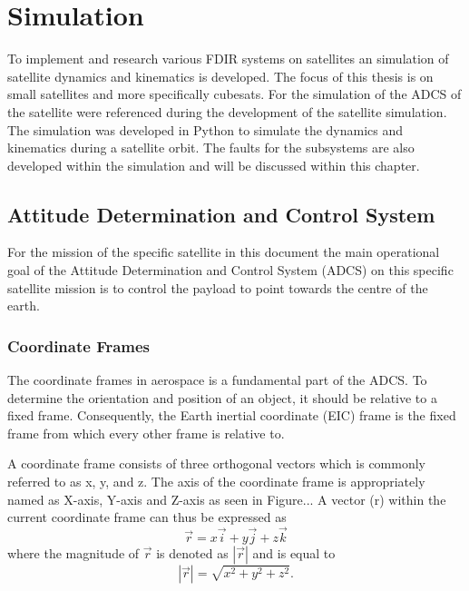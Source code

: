 \chapter{Simulation}
\label{chap:Simulation}

To implement and research various FDIR systems on satellites an simulation of satellite dynamics and kinematics is developed. The focus of this thesis is on small satellites and more specifically cubesats. For the simulation of the ADCS of the satellite \cite{auret2012design, JansevanVuuren2015, Jordaan2016} were referenced during the development of the satellite simulation. The simulation was developed in Python to simulate the dynamics and kinematics during a satellite orbit. The faults for the subsystems are also developed within the simulation and will be discussed within this chapter.

\section{Attitude Determination and Control System}

For the mission of the specific satellite in this document the main operational goal of the Attitude Determination and Control System (ADCS) on this specific satellite mission is to control the payload to point towards the centre of the earth. 

\subsection{Coordinate Frames}
The coordinate frames in aerospace is a fundamental part of the ADCS. To determine the orientation and position of an object, it should be relative to a fixed frame. Consequently, the Earth inertial coordinate (EIC) frame is the fixed frame from which every other frame is relative to.

A coordinate frame consists of three orthogonal vectors which is commonly referred to as x, y, and z. The axis of the coordinate frame is appropriately named as X-axis, Y-axis and Z-axis as seen in Figure... A vector (r) within the current coordinate frame can thus be expressed as 
\begin{equation}
\overrightarrow{r} = x\overrightarrow{i} + y\overrightarrow{j} + z\overrightarrow{k}
\end{equation}
where the magnitude of $\overrightarrow{r}$ is denoted as $|\overrightarrow{r}|$ and is equal to 
\begin{equation}
|\overrightarrow{r}| = \sqrt{x^2 + y^2 + z^2}.
\end{equation}

